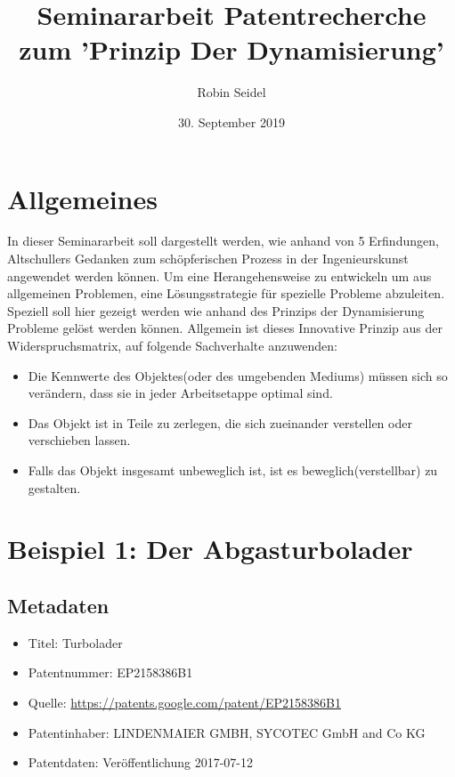 \documentclass{article}
\title{Seminararbeit Patentrecherche zum 'Prinzip Der Dynamisierung'}
\author{Robin Seidel}
\date{30. September 2019}
\begin{document}
\maketitle

\section{Allgemeines}
In dieser Seminararbeit soll dargestellt werden, wie anhand von 5 Erfindungen, Altschullers Gedanken zum schöpferischen Prozess in der Ingenieurskunst angewendet werden können. Um eine Herangehensweise zu entwickeln um aus allgemeinen Problemen, eine Lösungsstrategie für spezielle Probleme abzuleiten. 
Speziell soll hier gezeigt werden wie anhand des Prinzips der Dynamisierung  Probleme gelöst werden können. Allgemein ist dieses Innovative Prinzip aus der Widerspruchsmatrix, auf folgende Sachverhalte anzuwenden:
\begin{itemize}
\item
Die Kennwerte des Objektes(oder des umgebenden Mediums) müssen sich so verändern, dass sie in jeder Arbeitsetappe optimal sind.
\item
Das Objekt ist in Teile zu zerlegen, die sich zueinander verstellen oder verschieben lassen.
\item 
Falls das Objekt insgesamt unbeweglich ist, ist es beweglich(verstellbar) zu gestalten.
\end{itemize}

\section{Beispiel 1: Der Abgasturbolader}

\subsection{Metadaten}
\begin{itemize}\itemsep0pt
\item Titel: Turbolader
\item Patentnummer: EP2158386B1
\item Quelle: \url{https://patents.google.com/patent/EP2158386B1}
\item Patentinhaber: LINDENMAIER GMBH, SYCOTEC GmbH and Co KG
\item Patentdaten: Veröffentlichung 2017-07-12
\end{itemize}
\end{document}
